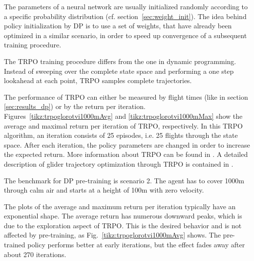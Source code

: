 The parameters of a neural network are usually initialized randomly according to a specific probability distribution (cf. section~\ref{sec:weight_init}). The idea behind policy initialization by DP is to use a set of weights, that have already been optimized in a similar scenario, in order to speed up convergence of a subsequent training procedure.

The TRPO training procedure differs from the one in dynamic programming. Instead of sweeping over the complete state space and performing a one step lookahead at each point, TRPO samples complete trajectories.

The performance of TRPO can either be measured by flight times (like in section \ref{sec:results_dp}) or by the return per iteration. Figures~\ref{tikz:trpoglorotvi1000mAvg} and \ref{tikz:trpoglorotvi1000mMax} show the average and maximal return per iteration of TRPO, respectively. In this TRPO algorithm, an iteration consists of 25 episodes, i.e. 25 flights through the state space. After each iteration, the policy parameters are changed in order to increase the expected return. More information about TRPO can be found in \cite{DBLP:journals/corr/SchulmanLMJA15}. A detailed description of glider trajectory optimization through TRPO is contained in \cite{Zuern2017}.

The benchmark for DP pre-training is scenario 2. The agent has to cover 1000m through calm air and starts at a height of 100m with zero velocity.

The plots of the average and maximum return per iteration typically have an exponential shape. The average return has numerous downward peaks, which is due to the exploration aspect of TRPO. This is the desired behavior and is not affected by pre-training, as Fig.~\ref{tikz:trpoglorotvi1000mAvg} shows. The pre-trained policy performs better at early iterations, but the effect fades away after about 270 iterations.

